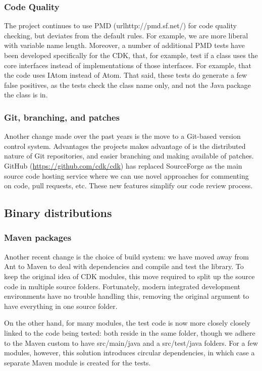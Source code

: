 \documentclass[10pt]{bmcart}
\begin{document}
  \subsubsection*{Code Quality}

The project continues to use PMD (url{http://pmd.sf.net/}) for code quality checking,
but deviates from the default rules. For example, we are more liberal with 
variable name length. Moreover, a number of additional PMD tests have been
developed specifically for the CDK, that, for example, test if a class uses
the core interfaces instead of implementations of those interfaces. For example,
that the code uses IAtom instead of Atom. That said, these tests do generate a
few false positives, as the tests check the class name only, and not the
Java package the class is in.

  \subsubsection*{Git, branching, and patches}

Another change made over the past years is the move to a Git-based version
control system. Advantages the projects makes advantage of is the distributed
nature of Git repositories, and easier branching and making available of
patches. GitHub (\url{https://github.com/cdk/cdk}) has replaced SourceForge
as the main source code hosting service
where we can use novel approaches for commenting on code, pull requests, etc.
These new features simplify our code review process.

\subsection*{Binary distributions}

\subsubsection*{Maven packages}

Another recent change is the choice of build system: we have moved away from
Ant to Maven to deal with dependencies and compile and test the library.
To keep the original idea of CDK modules, this move required to split up the
source code in multiple source folders. Fortunately, modern integrated
development environments have no trouble handling this, removing the original
argument to have everything in one source folder.

On the other hand, for many modules, the test code is now more closely closely
linked to the code being tested: both reside in the same folder, though we
adhere to the Maven custom to have src/main/java and a src/test/java folders.
For a few modules, however, this solution introduces circular dependencies, in
which case a separate Maven module is created for the tests.
\end{document}
